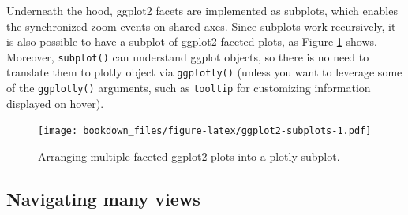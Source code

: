\documentclass[12pt,]{isuthesis}
\newenvironment{Shaded}{\begin{snugshade}}{\end{snugshade}}
\newcommand{\KeywordTok}[1]{\textcolor[rgb]{0.13,0.29,0.53}{\textbf{{#1}}}}
\newcommand{\DataTypeTok}[1]{\textcolor[rgb]{0.13,0.29,0.53}{{#1}}}
\newcommand{\DecValTok}[1]{\textcolor[rgb]{0.00,0.00,0.81}{{#1}}}
\newcommand{\StringTok}[1]{\textcolor[rgb]{0.31,0.60,0.02}{{#1}}}
\newcommand{\NormalTok}[1]{{#1}}
\begin{document}
Underneath the hood, ggplot2 facets are implemented as subplots, which
enables the synchronized zoom events on shared axes. Since subplots work
recursively, it is also possible to have a subplot of ggplot2 faceted
plots, as Figure \ref{fig:ggplot2-subplots} shows. Moreover,
\texttt{subplot()} can understand ggplot objects, so there is no need to
translate them to plotly object via \texttt{ggplotly()} (unless you want
to leverage some of the \texttt{ggplotly()} arguments, such as
\texttt{tooltip} for customizing information displayed on hover).

\begin{Shaded}
\end{Shaded}

\begin{figure}[htbp]
\centering
\texttt{[image: bookdown\_files/figure-latex/ggplot2-subplots-1.pdf]}
\caption{\label{fig:ggplot2-subplots}Arranging multiple faceted ggplot2
plots into a plotly subplot.}
\end{figure}

\hypertarget{navigating-many-views}{\subsection{Navigating many
views}\label{navigating-many-views}}
\end{document}
